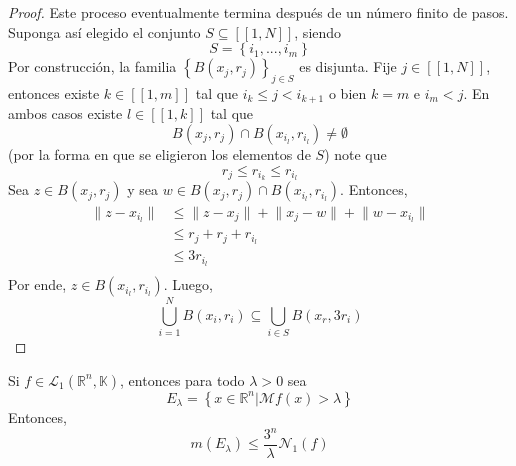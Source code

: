 \documentclass[12pt]{report}
\theoremstyle{largebreak}
\renewcommand{\leq}{\ensuremath{\leqslant}}
\newcommand\norm[1]{\ensuremath{\|#1\|}}
\newcommand{\N}[2]{\ensuremath{\mathcal{N}_{#1}\left(#2\right)}}
\newcommand{\natint}[1]{\ensuremath{\left[\!\left[#1\right]\!\right]}}
\begin{document}
\begin{proof}
        Este proceso eventualmente termina después de un número finito de pasos. Suponga así elegido el conjunto $S\subseteq\natint{1,N}$, siendo
        \begin{equation*}
            S=\left\{i_1,...,i_m\right\}
        \end{equation*}
        Por construcción, la familia $\left\{B(x_j,r_j) \right\}_{ j\in S}$ es disjunta. Fije $j\in\natint{1,N}$, entonces existe $k\in\natint{1,m}$ tal que $i_k\leq j<i_{ k+1}$ o bien $k=m$ e $i_m<j$. En ambos casos existe $l\in\natint{1,k}$ tal que
        \begin{equation*}
            B(x_j,r_j)\cap B(x_{ i_l},r_{ i_l})\neq\emptyset
        \end{equation*}
        (por la forma en que se eligieron los elementos de $S$) note que
        \begin{equation*}
            r_j\leq r_{ i_k}\leq r_{ i_l}
        \end{equation*}
        Sea $z\in B(x_j,r_j)$ y sea $w\in B(x_j,r_j)\cap B(x_{ i_l},r_{ i_l})$. Entonces,
        \begin{equation*}
            \begin{split}
                \norm{z-x_{ i_l}}&\leq\norm{z-x_j}+\norm{x_j-w}+\norm{w-x_{ i_l}}\\
                &\leq r_j+r_j+r_{ i_l}\\
                &\leq 3r_{ i_l}\\
            \end{split}
        \end{equation*}
        Por ende, $z\in B(x_{ i_l},r_{ i_l})$. Luego,
        \begin{equation*}
            \bigcup_{ i=1}^N B(x_i,r_i)\subseteq\bigcup_{ i\in S}B(x_r,3r_i)
        \end{equation*}
    \end{proof}

    \begin{propo}
        Si $f\in\mathcal{L}_1(\mathbb{R}^n,\mathbb{K})$, entonces para todo $\lambda>0$ sea
        \begin{equation*}
            E_\lambda=\left\{x\in\mathbb{R}^n\Big|\mathcal{M}f(x)>\lambda \right\}
        \end{equation*}
        Entonces,
        \begin{equation*}
            m(E_\lambda)\leq\frac{3^n}{\lambda}\N{1}{f}
        \end{equation*}
    \end{propo}
\end{document}
